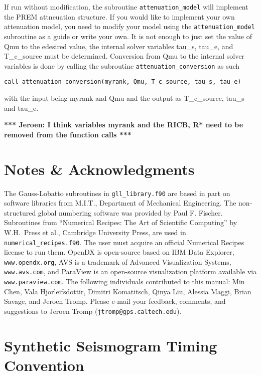 \documentclass[onecolumn]{article}
\newcommand{\tojeroen}[1]{\textbf{*** Jeroen: #1 ***}}
\begin{document}
If run without modification, the subroutine \texttt{attenuation\_model}
will implement the PREM attneuation
structure.  If you would like to implement your own attenuation model,
you need to modify your model
using the \texttt{attenuation\_model} subroutine as a guide or write
your own.  It is not enough to just set
the value of Qmu to the edesired value, the internal solver variables
tau\_s, tau\_e, and T\_c\_source must be determined.
Conversion from Qmu to the internal solver variables is done by calling
the subroutine \texttt{attenuation\_conversion}
as such
\begin{verbatim}
call attenuation_conversion(myrank, Qmu, T_c_source, tau_s, tau_e)
\end{verbatim}
with the input being myrank and Qmu and the output as T\_c\_source, tau\_s
and tau\_e.

\tojeroen{I think variables myrank and the RICB, R* need to be removed
from the function calls}

\section*{Notes \& Acknowledgments}

The Gauss-Lobatto subroutines in \texttt{gll\_library.f90} are based in part on
software libraries from M.I.T., Department of Mechanical Engineering.
The non-structured global numbering software was provided by Paul F. Fischer.
Subroutines from ``Numerical Recipes: The Art of Scientific Computing''
by W.H.\ Press et al., Cambridge University Press, are used in
\texttt{numerical\_recipes.f90}. The user must acquire an official
Numerical Recipes license to run them.
OpenDX is open-source based on IBM Data Explorer, \texttt{www.opendx.org},
AVS is a trademark of Advanced Visualization Systems, \texttt{www.avs.com},
and ParaView is an open-source visualization
platform available via \texttt{www.paraview.com}.
The following individuals contributed to this manual:
Min Chen, Vala Hjorleifsdottir, Dimitri Komatitsch, Qinya Liu,
Alessia Maggi, Brian Savage, and Jeroen Tromp.
Please e-mail your feedback, comments, and suggestions to
Jeroen Tromp (\texttt{jtromp@gps.caltech.edu}).





\appendix

\section{Synthetic Seismogram Timing Convention}
\end{document}

